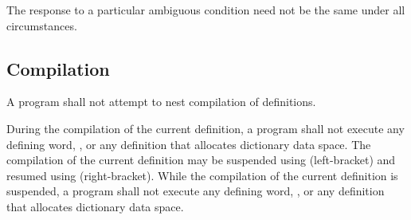 The response to a particular ambiguous condition need not be the
same under all circumstances.


\subsection{Compilation} %
\label{usage:compilation}

A program shall not attempt to nest compilation of definitions.

During the compilation of the current definition, a program shall
not execute any defining word, , or any definition
that allocates dictionary data space. The compilation of the
current definition may be suspended using \word{[} (left-bracket)
and resumed using \word{]} (right-bracket). While the compilation
of the current definition is suspended, a program shall not execute
any defining word, , or any definition that allocates
dictionary data space.
